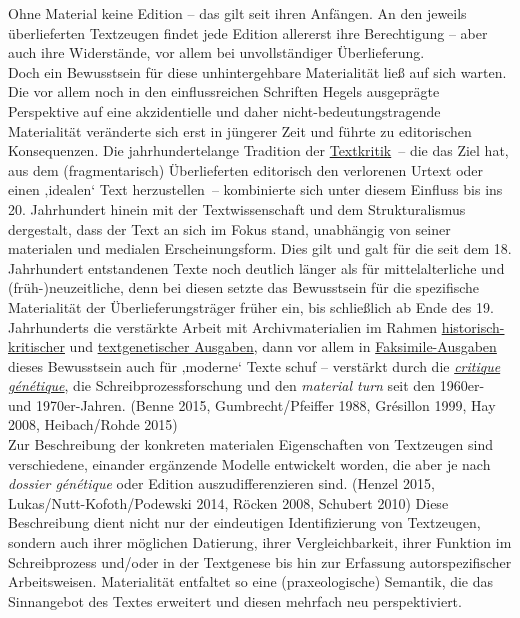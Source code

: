 \documentclass{article}
\begin{document}
    Ohne Material keine Edition – das gilt seit ihren Anfängen. An den jeweils
                  überlieferten Textzeugen findet jede Edition allererst ihre Berechtigung – aber
                  auch ihre Widerstände, vor allem bei unvollständiger Überlieferung.\\
            
        Doch ein Bewusstsein für diese unhintergehbare Materialität ließ auf sich warten.
                  Die vor allem noch in den einflussreichen Schriften Hegels ausgeprägte Perspektive
                  auf eine akzidentielle und daher nicht-bedeutungstragende Materialität veränderte
                  sich erst in jüngerer Zeit und führte zu editorischen Konsequenzen. Die
                  jahrhundertelange Tradition der \href{http://gams.uni-graz.at/o:konde.192}{Textkritik} – die das Ziel hat, aus dem (fragmentarisch) Überlieferten
                  editorisch den verlorenen Urtext oder einen ‚idealen‘ Text herzustellen –
                  kombinierte sich unter diesem Einfluss bis ins 20. Jahrhundert hinein mit der
                  Textwissenschaft und dem Strukturalismus dergestalt, dass der Text an sich im
                  Fokus stand, unabhängig von seiner materialen und medialen Erscheinungsform. Dies
                  gilt und galt für die seit dem 18. Jahrhundert entstandenen Texte noch deutlich
                  länger als für mittelalterliche und (früh-)neuzeitliche, denn bei diesen setzte
                  das Bewusstsein für die spezifische Materialität der Überlieferungsträger früher
                  ein, bis schließlich ab Ende des 19. Jahrhunderts die verstärkte Arbeit mit
                  Archivmaterialien im Rahmen \href{http://gams.uni-graz.at/o:konde.93}{historisch-kritischer} und \href{http://gams.uni-graz.at/o:konde.90}{textgenetischer Ausgaben}, dann vor allem in \href{http://gams.uni-graz.at/o:konde.83}{Faksimile-Ausgaben} dieses Bewusstsein auch für
                  ‚moderne‘ Texte schuf – verstärkt durch die \emph{\href{http://gams.uni-graz.at/o:konde.46}{critique génétique}}, die Schreibprozessforschung und den \emph{material turn}
                  seit den 1960er- und 1970er-Jahren. (Benne 2015, Gumbrecht/Pfeiffer 1988,
                     Grésillon 1999, Hay 2008, Heibach/Rohde 2015)\\
            
        Zur Beschreibung der konkreten materialen Eigenschaften von Textzeugen sind
                  verschiedene, einander ergänzende Modelle entwickelt worden, die aber je nach \emph{dossier génétique} oder Edition auszudifferenzieren sind.
                     (Henzel 2015, Lukas/Nutt-Kofoth/Podewski 2014, Röcken 2008, Schubert
                     2010) Diese Beschreibung dient nicht nur der eindeutigen Identifizierung
                  von Textzeugen, sondern auch ihrer möglichen Datierung, ihrer Vergleichbarkeit,
                  ihrer Funktion im Schreibprozess und/oder in der Textgenese bis hin zur Erfassung
                  autorspezifischer Arbeitsweisen. Materialität entfaltet so eine (praxeologische)
                  Semantik, die das Sinnangebot des Textes erweitert und diesen mehrfach neu
                  perspektiviert. \\
            
\end{document}
